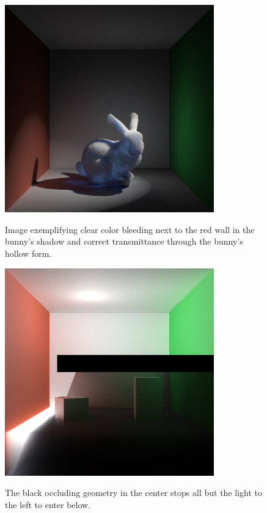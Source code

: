 \documentclass[12pt]{ucthesis}
\newcommand{\captionfonts}{\small\bf\ssp}
\begin{document}
\begin{figure}[h!]
    \centering
    \includegraphics[height=90mm]{img/bunny_spot/spot_right_new.png}
    \captionfonts
    \caption{Image exemplifying clear color bleeding next to the red wall in the bunny's shadow and correct transmittance through the bunny's hollow form.}
\end{figure}

\begin{figure}[h!]
    \centering
    \includegraphics[height=90mm]{img/one_side_corrected.png}
    \captionfonts
    \caption{The black occluding geometry in the center stops all but the light to the left to enter below.}
\end{figure}
\end{document}
